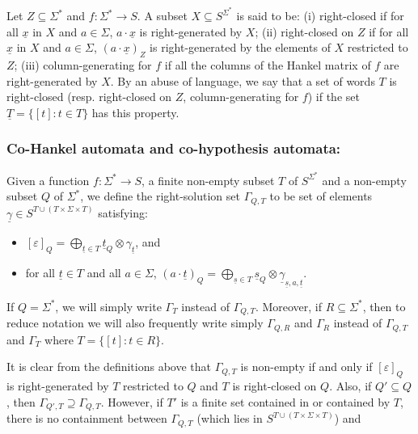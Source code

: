 \documentclass{lmcs}
\numberwithin{theorem}{section}
\begin{document}
Let  $Z \subseteq \Sigma^*$ and $f: \Sigma^* \rightarrow S$. A subset $X \subseteq S^{\Sigma^*}$ is said to be: (i) right-closed if for all $\underline{x}$ in $X$ and $a \in \Sigma$, $a \cdot \underline{x}$ is right-generated by $X$; (ii) right-closed on $Z$ if for all $\underline{x}$ in $X$ and $a \in \Sigma$, $(a\cdot\underline{x})_Z$ is right-generated by the elements of $X$ restricted to $Z$; (iii) column-generating for $f$ if all the columns of the Hankel matrix of $f$ are right-generated by $X$. By an abuse of language, we say that a set of words $T$ is right-closed (resp. right-closed on $Z$, column-generating for $f$) if the set $\underline{T}=\{ [t]: t \in T\}$ has this property.

\subsubsection*{\textbf{Co-Hankel automata and  co-hypothesis automata:}} 
\begin{nota}
\label{nota:gamma}
Given a function $f: \Sigma^* \rightarrow S$, a finite non-empty subset $T$ of $S^{\Sigma^*}$ and a non-empty subset $Q$ of $\Sigma^*$, we define the right-solution set $\Gamma_{Q, T}$ to be set of elements $\underline{\gamma}
\in S^{T \cup (T \times \Sigma \times T)}$ satisfying:
\begin{itemize}
\item $[ \varepsilon ]_Q = \bigoplus_{\underline{t} \in T}  \underline{t}_Q \otimes \gamma_{\underline{t}}$, and
\item for all $\underline{t} \in T$ and all $a \in \Sigma$, $(a \cdot \underline{t})_Q = \bigoplus_{\underline{s} \in T} \underline{s}_Q \otimes \underline{\gamma}_{\underline{s},a,\underline{t}}$.
\end{itemize}\noindent %
If $Q = \Sigma^*$, we will simply write $\Gamma_T$ instead of $\Gamma_{Q, T}$. Moreover, if $R \subseteq \Sigma^*$, then to reduce notation we will also frequently write simply $\Gamma_{Q, R}$ and  $\Gamma_{R}$ instead of $\Gamma_{Q, T}$ and $\Gamma_{T}$   where $T = \{[t] : t \in R\}$.
\end{nota}
It is clear from the definitions above that $\Gamma_{Q,T}$ is non-empty if and only if $[ \varepsilon ]_Q$ is right-generated by $T$ restricted to $Q$ and $T$ is right-closed on $Q$. Also, if $Q'\subseteq Q$, then $\Gamma_{Q', T} \supseteq \Gamma_{Q, T}$. However, if $T'$ is a finite set contained in or contained by $T$, there is no containment between $\Gamma_{Q, T}$ (which lies in $S^{T \cup (T\times \Sigma \times T)}$) and 
\end{document}
